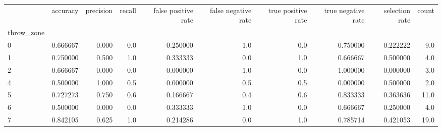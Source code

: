 \begin{tabular}{lrrrrrrrrr}
\toprule
{} &  accuracy &  precision &  recall &  false positive rate &  false negative rate &  true positive rate &  true negative rate &  selection rate &  count \\
throw\_zone &           &            &         &                      &                      &                     &                     &                 &        \\
\midrule
0          &  0.666667 &      0.000 &     0.0 &             0.250000 &                  1.0 &                 0.0 &            0.750000 &        0.222222 &    9.0 \\
1          &  0.750000 &      0.500 &     1.0 &             0.333333 &                  0.0 &                 1.0 &            0.666667 &        0.500000 &    4.0 \\
2          &  0.666667 &      0.000 &     0.0 &             0.000000 &                  1.0 &                 0.0 &            1.000000 &        0.000000 &    3.0 \\
4          &  0.500000 &      1.000 &     0.5 &             0.000000 &                  0.5 &                 0.5 &            0.000000 &        0.500000 &    2.0 \\
5          &  0.727273 &      0.750 &     0.6 &             0.166667 &                  0.4 &                 0.6 &            0.833333 &        0.363636 &   11.0 \\
6          &  0.500000 &      0.000 &     0.0 &             0.333333 &                  1.0 &                 0.0 &            0.666667 &        0.250000 &    4.0 \\
7          &  0.842105 &      0.625 &     1.0 &             0.214286 &                  0.0 &                 1.0 &            0.785714 &        0.421053 &   19.0 \\
\bottomrule
\end{tabular}
